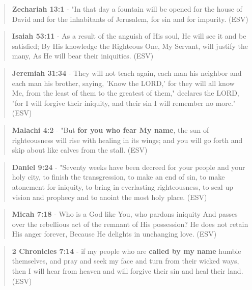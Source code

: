 \documentclass[11pt]{article}
\begin{document}
\begin{quote}
\textbf{Zechariah 13:1} - "In that day a fountain will be opened for the house of David and for the inhabitants of Jerusalem, for sin and for impurity. (ESV)
\end{quote}

\begin{quote}
\textbf{Isaiah 53:11} - As a result of the anguish of His soul, He will see it and be satisfied; By His knowledge the Righteous One, My Servant, will justify the many, As He will bear their iniquities. (ESV)
\end{quote}

\begin{quote}
\textbf{Jeremiah 31:34} - They will not teach again, each man his neighbor and each man his brother, saying, 'Know the LORD,' for they will all know Me, from the least of them to the greatest of them," declares the LORD, "for I will forgive their iniquity, and their sin I will remember no more." (ESV)
\end{quote}

\begin{quote}
\textbf{Malachi 4:2} - "But \textbf{for you who fear My name}, the sun of righteousness will rise with healing in its wings; and you will go forth and skip about like calves from the stall. (ESV)
\end{quote}

\begin{quote}
\textbf{Daniel 9:24} - "Seventy weeks have been decreed for your people and your holy city, to finish the transgression, to make an end of sin, to make atonement for iniquity, to bring in everlasting righteousness, to seal up vision and prophecy and to anoint the most holy place. (ESV)
\end{quote}

\begin{quote}
\textbf{Micah 7:18} - Who is a God like You, who pardons iniquity And passes over the rebellious act of the remnant of His possession? He does not retain His anger forever, Because He delights in unchanging love. (ESV)
\end{quote}

\begin{quote}
\textbf{2 Chronicles 7:14} - if my people who are \textbf{called by my name} humble themselves, and pray and seek my face and turn from their wicked ways, then I will hear from heaven and will forgive their sin and heal their land. (ESV)
\end{quote}
\end{document}
